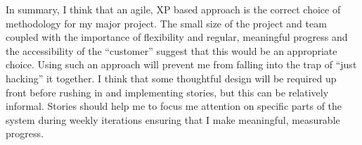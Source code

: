 \documentclass[paper=a4, fontsize=11pt]{scrartcl}	%
\numberwithin{equation}{section} %
\numberwithin{figure}{section} %
\numberwithin{table}{section}
\begin{document}
In summary, I think that an agile, XP based approach is the correct choice of methodology for my major project. The small size of the project and team coupled with the importance of flexibility and regular, meaningful progress and the accessibility of the ``customer'' suggest that this would be an appropriate choice. Using such an approach will prevent me from falling into the trap of ``just hacking'' it together. I think that some thoughtful design will be required up front before rushing in and implementing stories, but this can be relatively informal. Stories should help me to focus me attention on specific parts of the system during weekly iterations ensuring that I make meaningful, measurable progress.

\clearpage


\end{document}
